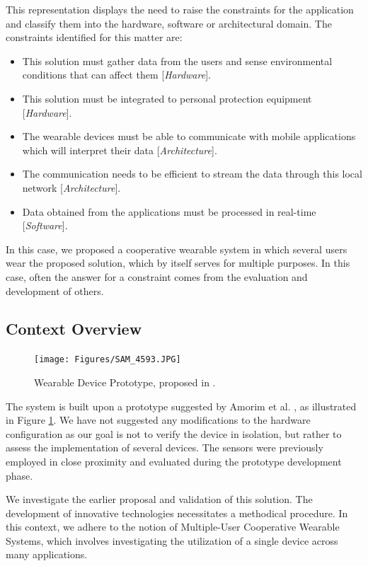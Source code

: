 This representation displays the need to raise the constraints for the application and classify them into the hardware, software or architectural domain. The constraints identified for this matter are:

\begin{itemize}
    \item This solution must gather data from the users and sense environmental conditions that can affect them [\textit{Hardware}].
    \item This solution must be integrated to personal protection equipment [\textit{Hardware}].
    \item The wearable devices must be able to communicate with mobile applications which will interpret their data [\textit{Architecture}].
    \item The communication needs to be efficient to stream the data through this local network [\textit{Architecture}].
    \item Data obtained from the applications must be processed in real-time [\textit{Software}].
\end{itemize}

In this case, we proposed a cooperative wearable system in which several users wear the proposed solution, which by itself serves for multiple purposes. In this case, often the answer for a constraint comes from the evaluation and development of others.

\subsection{Context Overview}

\begin{figure}[h!]
    \centering
    \texttt{[image: Figures/SAM\_4593.JPG]}
    \caption{Wearable Device Prototype, proposed in \cite{jp2019software}.}
    \label{fig:prototype}
\end{figure}

The system is built upon a prototype suggested by Amorim et al. \cite{jp2019software}, as illustrated in Figure \ref{fig:prototype}. We have not suggested any modifications to the hardware configuration as our goal is not to verify the device in isolation, but rather to assess the implementation of several devices. The sensors were previously employed in close proximity and evaluated during the prototype development phase.

We investigate the earlier proposal and validation of this solution. The development of innovative technologies necessitates a methodical procedure. In this context, we adhere to the notion of Multiple-User Cooperative Wearable Systems, which involves investigating the utilization of a single device across many applications.

